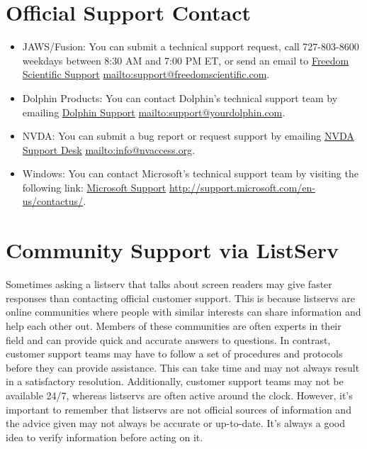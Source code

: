 \documentclass[12pt,letterpaper,twoside,openright]{report}
\begin{document}
\begin{appendices}
\hypertarget{report}{}\section{Official Support Contact}\label{report}
\begin{itemize}[leftmargin=*]
\item JAWS/Fusion: You can submit a technical support request, call 727-803-8600 weekdays between 8:30 AM and 7:00 PM ET, or send an email to \href{mailto:support@freedomscientific.com}{Freedom Scientific Support} \url{mailto:support@freedomscientific.com}.
\item Dolphin Products: You can contact Dolphin’s technical support team by emailing \href{mailto:support@yourdolphin.com}{Dolphin Support} \url{mailto:support@yourdolphin.com}.
\item NVDA: You can submit a bug report or request support by emailing \href{mailto:info@nvaccess.org}{NVDA Support Desk} \url{mailto:info@nvaccess.org}.
\item Windows: You can contact Microsoft’s technical support team by visiting the following link: \href{http://support.microsoft.com/en-us/contactus/}{Microsoft Support} \url{http://support.microsoft.com/en-us/contactus/}.
\end{itemize}
\hypertarget{listserv}{}\section{Community Support via ListServ}\label{listserv}
Sometimes asking a listserv that talks about screen readers may give faster responses than contacting official customer support. This is because listservs are online communities where people with similar interests can share information and help each other out. Members of these communities are often experts in their field and can provide quick and accurate answers to questions. In contrast, customer support teams may have to follow a set of procedures and protocols before they can provide assistance. This can take time and may not always result in a satisfactory resolution. Additionally, customer support teams may not be available 24/7, whereas listservs are often active around the clock. However, it’s important to remember that listservs are not official sources of information and the advice given may not always be accurate or up-to-date. It’s always a good idea to verify information before acting on it.


\end{appendices}
\end{document}
